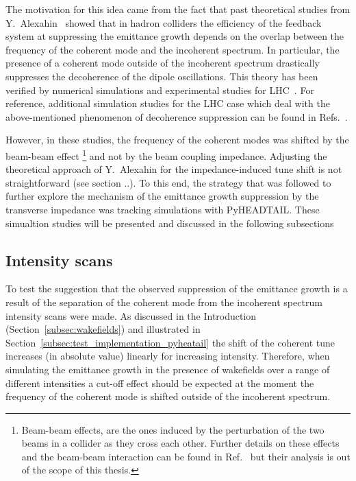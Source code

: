 The motivation for this idea came from the fact that past theoretical studies from Y.~Alexahin~\cite{Alexahin:314169} showed that in hadron colliders the efficiency of the feedback system at suppressing the emittance growth depends on the overlap between the frequency of the coherent mode and the incoherent spectrum. In particular, the presence of a coherent mode outside of the incoherent spectrum drastically suppresses the decoherence of the dipole oscillations. This theory has been verified by numerical simulations and experimental studies for LHC~\cite{QIANG201853, PhysRevAccelBeams.23.021002, PhysRevAccelBeams.24.011003}. %
For reference, additional simulation studies for the LHC case which deal with the above-mentioned phenomenon of decoherence suppression can be found in Refs.~\cite{Alexahin:497415, Herr:486007}. 

However, in these studies, the frequency of the coherent modes was shifted by the beam-beam effect \footnote{Beam-beam effects, are the ones induced by the perturbation of the two beams in a collider as they cross each other. Further details on these effects and the beam-beam interaction can be found in Ref.~\cite{Herr:1982430} but their analysis is out of the scope of this thesis.} and not by the beam coupling impedance. Adjusting the theoretical approach of Y.~Alexahin for the impedance-induced tune shift is not straightforward (see section ..). To this end, the strategy that was followed to further explore the mechanism of the emittance growth suppression by the transverse impedance was tracking simulations with PyHEADTAIL. These simualtion studies will be presented and discussed in the following subsections


\subsection{Intensity scans}
To test the suggestion that the observed suppression of the emittance growth is a result of the separation of the coherent mode from the incoherent spectrum intensity scans were made. As discussed in the Introduction (Section~\ref{subsec:wakefields}) and illustrated in Section~\ref{subsec:test_implementation_pyheatail} the shift of the coherent tune increases (in absolute value) linearly for increasing intensity. Therefore, when simulating the emittance growth in the presence of wakefields over a range of different intensities a cut-off effect should be expected at the moment the frequency of the coherent mode is shifted outside of the incoherent spectrum.



